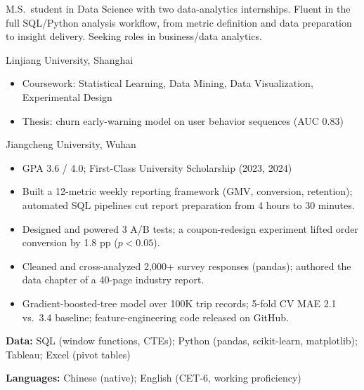 \documentclass{common/resume}
\begin{document}

M.S.\ student in Data Science with two data-analytics internships. Fluent in the full SQL/Python analysis workflow, from metric definition and data preparation to insight delivery. Seeking roles in business/data analytics.

Linjiang University, Shanghai
\begin{itemize}
  \item Coursework: Statistical Learning, Data Mining, Data Visualization, Experimental Design
  \item Thesis: churn early-warning model on user behavior sequences (AUC 0.83)
\end{itemize}
Jiangcheng University, Wuhan
\begin{itemize}
  \item GPA 3.6 / 4.0; First-Class University Scholarship (2023, 2024)
\end{itemize}

\begin{itemize}
  \item Built a 12-metric weekly reporting framework (GMV, conversion, retention); automated SQL pipelines cut report preparation from 4 hours to 30 minutes.
  \item Designed and powered 3 A/B tests; a coupon-redesign experiment lifted order conversion by 1.8 pp ($p<0.05$).
\end{itemize}
\begin{itemize}
  \item Cleaned and cross-analyzed 2,000+ survey responses (pandas); authored the data chapter of a 40-page industry report.
\end{itemize}

\begin{itemize}
  \item Gradient-boosted-tree model over 100K trip records; 5-fold CV MAE 2.1 vs.\ 3.4 baseline; feature-engineering code released on GitHub.
\end{itemize}

\textbf{Data:} SQL (window functions, CTEs); Python (pandas, scikit-learn, matplotlib); Tableau; Excel (pivot tables)\par
\textbf{Languages:} Chinese (native); English (CET-6, working proficiency)
\end{document}
